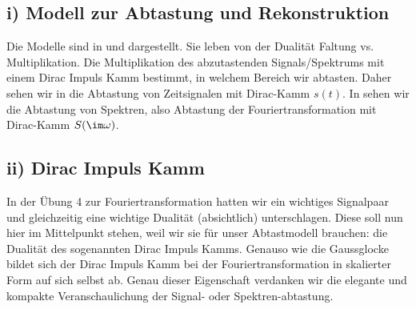 \subsection*{i) Modell zur Abtastung und Rekonstruktion}
Die Modelle sind in 
und  dargestellt. Sie leben
von der Dualität Faltung vs. Multiplikation.
Die Multiplikation des abzutastenden Signals/Spektrums mit einem Dirac Impuls Kamm
bestimmt, in welchem Bereich wir abtasten.
Daher sehen wir in  die Abtastung
von Zeitsignalen mit Dirac-Kamm $s(t)$. In 
sehen wir die Abtastung von Spektren, also Abtastung der Fouriertransformation
mit Dirac-Kamm $S(\im\omega)$.









\subsection*{ii) Dirac Impuls Kamm}
%
In der Übung 4 zur Fouriertransformation hatten wir ein wichtiges
Signalpaar und gleichzeitig eine wichtige Dualität (absichtlich) unterschlagen.
%
Diese soll nun hier im Mittelpunkt stehen, weil wir sie für unser Abtastmodell
brauchen: die Dualität des sogenannten Dirac Impuls Kamms.
%
Genauso wie die Gaussglocke bildet sich der Dirac Impuls Kamm bei der
Fouriertransformation in skalierter Form auf sich selbst ab.
%
Genau dieser Eigenschaft verdanken wir die elegante und kompakte Veranschaulichung
der Signal- oder Spektren-abtastung.

